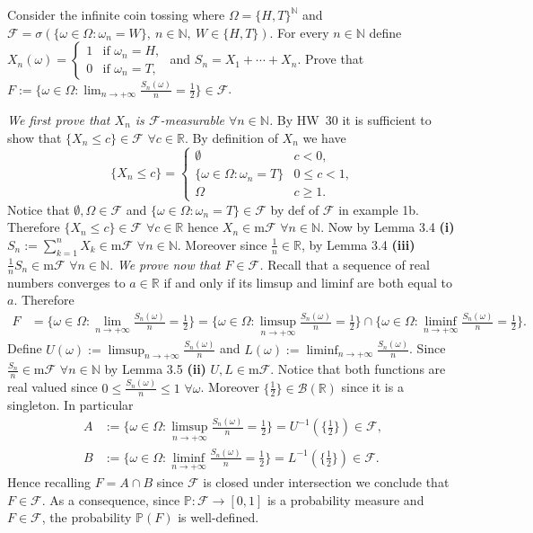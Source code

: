 \documentclass[11pt,a4paper]{article}
\newcommand{\studyheading}[1]{{\color{StudyBlue}\normalfont\bfseries\boldmath #1}}
\newcommand{\studylabel}[1]{\textcolor{StudyBlue}{\textnormal{\bfseries #1}}}
\begin{document}
Consider the infinite coin tossing where $\Omega=\{H,T\}^{\mathbb N}$ and
$\mathcal F=\sigma(\{\omega\in\Omega:\omega_n=W\},\ n\in\mathbb N,\ W\in\{H,T\})$.
For every $n\in\mathbb N$ define $X_n(\omega)=\begin{cases}1&\text{if }\omega_n=H,\\0&\text{if }\omega_n=T,\end{cases}$ and $S_n=X_1+\cdots+X_n$.
Prove that $F:=\{\omega\in\Omega:\lim_{n\to+\infty}\frac{S_n(\omega)}n=\frac12\}\in\mathcal F$.
\par\noindent\studyheading{Proof.}\par\nobreak
\emph{We first prove that $X_n$ is $\mathcal F$-measurable $\forall n\in\mathbb N$.}
By HW~30 it is sufficient to show that $\{X_n\le c\}\in\mathcal F$ $\forall c\in\mathbb R$.
By definition of $X_n$ we have
\[
\{X_n\le c\}=\begin{cases}\emptyset&c<0,\\\{\omega\in\Omega:\omega_n=T\}&0\le c<1,\\\Omega&c\ge1.\end{cases}
\]
Notice that $\emptyset,\Omega\in\mathcal F$ and $\{\omega\in\Omega:\omega_n=T\}\in\mathcal F$ by def of $\mathcal F$ in example 1b.
Therefore $\{X_n\le c\}\in\mathcal F$ $\forall c\in\mathbb R$ hence $X_n\in\mathrm m\mathcal F$ $\forall n\in\mathbb N$.
Now by Lemma 3.4 \studylabel{(i)} $S_n:=\sum_{k=1}^n X_k\in\mathrm m\mathcal F$ $\forall n\in\mathbb N$.
Moreover since $\frac1n\in\mathbb R$, by Lemma 3.4 \studylabel{(iii)} $\frac1n S_n\in\mathrm m\mathcal F$ $\forall n\in\mathbb N$.
\emph{We prove now that $F\in\mathcal F$.}
Recall that a sequence of real numbers converges to $a\in\mathbb R$ if and only if its limsup and liminf are both equal to $a$.
Therefore
\[
\begin{aligned}
F&=\{\omega\in\Omega:\lim_{n\to+\infty}\tfrac{S_n(\omega)}n=\tfrac12\} =\{\omega\in\Omega:\limsup_{n\to+\infty}\tfrac{S_n(\omega)}n=\tfrac12\}
\cap\{\omega\in\Omega:\liminf_{n\to+\infty}\tfrac{S_n(\omega)}n=\tfrac12\}.
\end{aligned}
\]
Define $U(\omega):=\limsup_{n\to+\infty}\frac{S_n(\omega)}n$ and $L(\omega):=\liminf_{n\to+\infty}\frac{S_n(\omega)}n$.
Since $\frac{S_n}n\in\mathrm m\mathcal F$ $\forall n\in\mathbb N$ by Lemma 3.5 \studylabel{(ii)} $U,L\in\mathrm m\mathcal F$.
Notice that both functions are real valued since $0\le\frac{S_n(\omega)}n\le1$ $\forall\omega$.
Moreover $\{\frac12\}\in\mathcal B(\mathbb R)$ since it is a singleton.
In particular
\[
\begin{aligned}
A&:=\{\omega\in\Omega:\limsup_{n\to+\infty}\tfrac{S_n(\omega)}n=\tfrac12\}
=U^{-1}(\{\tfrac12\})\in\mathcal F,\\
B&:=\{\omega\in\Omega:\liminf_{n\to+\infty}\tfrac{S_n(\omega)}n=\tfrac12\}
=L^{-1}(\{\tfrac12\})\in\mathcal F.
\end{aligned}
\]
Hence recalling $F=A\cap B$ since $\mathcal F$ is closed under intersection we conclude that $F\in\mathcal F$.
As a consequence, since $\mathbb P:\mathcal F\to[0,1]$ is a probability measure and $F\in\mathcal F$, the probability $\mathbb P(F)$ is well-defined.
%
\end{document}
